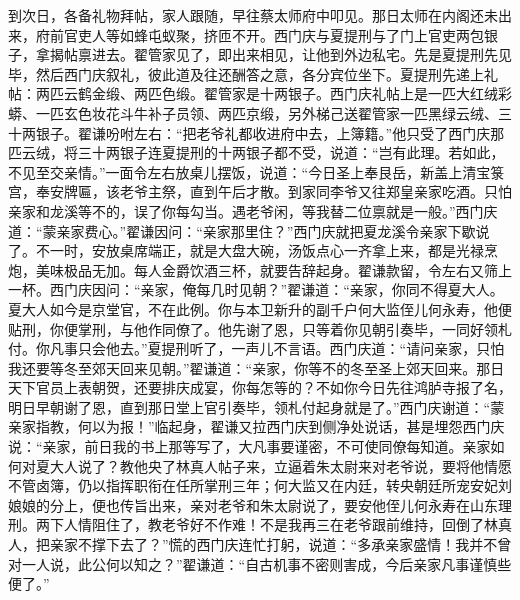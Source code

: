 到次日，各备礼物拜帖，家人跟随，早往蔡太师府中叩见。那日太师在内阁还未出来，府前官吏人等如蜂屯蚁聚，挤匝不开。西门庆与夏提刑与了门上官吏两包银子，拿揭帖禀进去。翟管家见了，即出来相见，让他到外边私宅。先是夏提刑先见毕，然后西门庆叙礼，彼此道及往还酬答之意，各分宾位坐下。夏提刑先递上礼帖：两匹云鹤金缎、两匹色缎。翟管家是十两银子。西门庆礼帖上是一匹大红绒彩蟒、一匹玄色妆花斗牛补子员领、两匹京缎，另外梯己送翟管家一匹黑绿云绒、三十两银子。翟谦吩咐左右：“把老爷礼都收进府中去，上簿籍。”他只受了西门庆那匹云绒，将三十两银子连夏提刑的十两银子都不受，说道：“岂有此理。若如此，不见至交亲情。”一面令左右放桌儿摆饭，说道：“今日圣上奉艮岳，新盖上清宝箓宫，奉安牌匾，该老爷主祭，直到午后才散。到家同李爷又往郑皇亲家吃酒。只怕亲家和龙溪等不的，误了你每勾当。遇老爷闲，等我替二位禀就是一般。”西门庆道：“蒙亲家费心。”翟谦因问：“亲家那里住？”西门庆就把夏龙溪令亲家下歇说了。不一时，安放桌席端正，就是大盘大碗，汤饭点心一齐拿上来，都是光禄烹炮，美味极品无加。每人金爵饮酒三杯，就要告辞起身。翟谦款留，令左右又筛上一杯。西门庆因问：“亲家，俺每几时见朝？”翟谦道：“亲家，你同不得夏大人。夏大人如今是京堂官，不在此例。你与本卫新升的副千户何大监侄儿何永寿，他便贴刑，你便掌刑，与他作同僚了。他先谢了恩，只等着你见朝引奏毕，一同好领札付。你凡事只会他去。”夏提刑听了，一声儿不言语。西门庆道：“请问亲家，只怕我还要等冬至郊天回来见朝。”翟谦道：“亲家，你等不的冬至圣上郊天回来。那日天下官员上表朝贺，还要排庆成宴，你每怎等的？不如你今日先往鸿胪寺报了名，明日早朝谢了恩，直到那日堂上官引奏毕，领札付起身就是了。”西门庆谢道：“蒙亲家指教，何以为报！”临起身，翟谦又拉西门庆到侧净处说话，甚是埋怨西门庆说：“亲家，前日我的书上那等写了，大凡事要谨密，不可使同僚每知道。亲家如何对夏大人说了？教他央了林真人帖子来，立逼着朱太尉来对老爷说，要将他情愿不管卤簿，仍以指挥职衔在任所掌刑三年；何大监又在内廷，转央朝廷所宠安妃刘娘娘的分上，便也传旨出来，亲对老爷和朱太尉说了，要安他侄儿何永寿在山东理刑。两下人情阻住了，教老爷好不作难！不是我再三在老爷跟前维持，回倒了林真人，把亲家不撑下去了？”慌的西门庆连忙打躬，说道：“多承亲家盛情！我并不曾对一人说，此公何以知之？”翟谦道：“自古机事不密则害成，今后亲家凡事谨慎些便了。”

